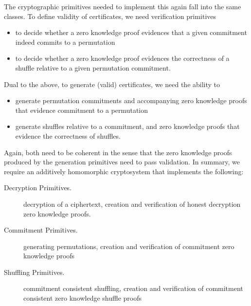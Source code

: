 \documentclass{llncs}
\begin{document}
\noindent
The cryptographic primitives needed to implement this again fall
into the same classes. To define validity of certificates, we need
verification primitives
\begin{itemize}
  \item to decide whether a zero knowledge proof evidences that a
  given commitment indeed commits to a permutation 
  \item to decide whether a zero knowledge proof evidences the
  correctness of a shuffle relative to a given permutation
  commitment.
\end{itemize}

\noindent
Dual to the above, to generate (valid) certificates, we need the
ability to
\begin{itemize}
  \item generate permutation commitments and accompanying zero
  knowledge proofs that evidence commitment to a permutation
  \item generate shuffles relative to a commitment, and zero
  knowledge proofs that evidence the correctness of shuffles.
\end{itemize}

\noindent
Again, both need to be coherent in the sense that the zero knowledge
proofs produced by the generation primitives need to pass
validation. In summary, we require an additively homomorphic
cryptosystem that implements the following:

\begin{description}
\item[Decryption Primitives.]
  decryption of a ciphertext, creation and verification of
  honest decryption zero knowledge proofs.
\item[Commitment Primitives.]
  generating permutations, creation and verification of commitment
  zero knowledge proofs
\item[Shuffling Primitives.]
  commitment consistent shuffling, creation and verification of
  commitment consistent zero knowledge shuffle proofs 
\end{description}
\end{document}
